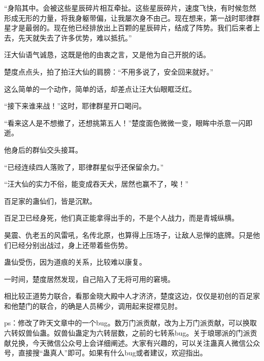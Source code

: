 \begin{this_body}
“身陷其中。会被这些星辰碎片相互牵扯。这些星辰碎片，速度飞快，有时候忽然形成无形的力量，将我身躯带偏，让我屡次身不由己。现在想来，第一战时耶律群星才是最弱的。现在他已经排放出上百颗的星辰碎片，结成了阵势。我们后来者上去，先天就失去了许多优势，难以抵抗。”

汪大仙语气诚恳，这既是他的由衷之言，又是他为自己开脱的话。

楚度点点头，拍了拍汪大仙的肩膀：“不用多说了，安全回来就好。”

这么简单的一个动作，简单的话，却差点让汪大仙眼眶泛红。

“接下来谁来战！”这时，耶律群星开口喝问。

“看来这人是不想撤了，还想挑第五人！”楚度面色微微一变，眼眸中杀意一闪即逝。

他身后的群仙交头接耳。

“已经连续四人落败了，耶律群星似乎还保留余力。”

“汪大仙的实力不俗，能变成吞天犬，居然也赢不了，唉！”

百足家的蛊仙们，皆是沉默。

百足卫已经身死，他们真正能拿得出手的，不是个人战力，而是青城纵横。

昊震、仇老五的风雷吼，名传北原，也算得上压场子，让敌人忌惮的底牌。只是他们已经分别出战过，身上还带着些伤势。

蛊仙受伤，因为道痕的关系，比较难以康复。

一时间，楚度居然发现，自己陷入了无将可用的窘境。

相比较正道势力联合，看那金晓大殿中人才济济，楚度这边，仅仅是初创的百足家和他楚门的联合，的确是人员稀少，调用起来捉襟见肘。

ps：修改了昨天文章中的一个bug。数万门派贡献，改为上万门派贡献，可以换取六转奴兽仙蛊。奴兽仙蛊定为六转层数，之前的七转系bug。关于琅琊派的门派贡献兑换，今天微信公众号上会详细阐述。大家有兴趣的，可以关注蛊真人微信公众号，直接搜“蛊真人”即可。如果有什么bug或者建议，欢迎指出。

\end{this_body}

